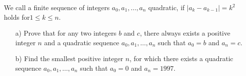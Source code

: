 We call a finite sequence of integers $a_0,a_1,\ldots,a_n$ quadratic, if
$|a_k-a_{k-1}|=k^2$ holds for$1 \leq k\leq n$.
\begin{enumerate}
    \item[a)] Prove that for any two integers $b$ and $c$, there always exists a positive integer 
	$n$ and a quadratic sequence $a_0,a_1,\ldots,a_n$ such that $a_0=b$ and $a_n=c$.
    \item[b)]Find the smallest positive integer $n$, for which there exists a quadratic sequence
	$a_0,a_1,\ldots,a_n$ such that $a_0=0$ and $a_n=1997$.
\end{enumerate}

